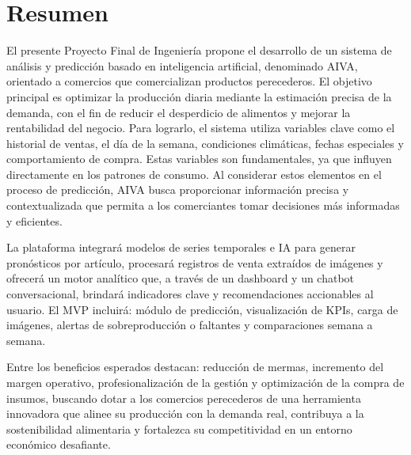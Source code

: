 \chapter*{Resumen}
    El presente Proyecto Final de Ingeniería propone el desarrollo de un sistema de análisis y predicción basado en inteligencia artificial, denominado AIVA, orientado a comercios que comercializan productos perecederos. El objetivo principal es optimizar la producción diaria mediante la estimación precisa de la demanda, con el fin de reducir el desperdicio de alimentos y mejorar la rentabilidad del negocio. Para lograrlo, el sistema utiliza variables clave como el historial de ventas, el día de la semana, condiciones climáticas, fechas especiales y comportamiento de compra. Estas variables son fundamentales, ya que influyen directamente en los patrones de consumo. Al considerar estos elementos en el proceso de predicción, AIVA busca proporcionar información precisa y contextualizada que permita a los comerciantes tomar decisiones más informadas y eficientes.
    
    La plataforma integrará modelos de series temporales e IA para generar pronósticos por artículo, procesará registros de venta extraídos de imágenes y ofrecerá un motor analítico que, a través de un dashboard y un chatbot conversacional, brindará indicadores clave y recomendaciones accionables al usuario. El MVP incluirá: módulo de predicción, visualización de KPIs, carga de imágenes, alertas de sobreproducción o faltantes y comparaciones semana a semana.

    Entre los beneficios esperados destacan: reducción de mermas, incremento del margen operativo, profesionalización de la gestión y optimización de la compra de insumos, buscando dotar a los comercios perecederos de una herramienta innovadora que alinee su producción con la demanda real, contribuya a la sostenibilidad alimentaria y fortalezca su competitividad en un entorno económico desafiante. 

